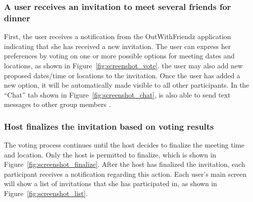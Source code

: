 \subsubsection{A user receives an invitation to meet several friends for dinner}
First, the user receives a notification from the OutWithFriendz application
indicating that she has received a new invitation. The user can express her 
preferences by voting on one or more possible options for meeting dates and
locations, as shown in Figure~\ref{fig:screenshot_vote}.  
the user may also add
new proposed dates/time or locations to the invitation. Once the user has added a new
option, it will be automatically made visible to all other participants. 
In the ``Chat'' tab shown in Figure~\ref{fig:screenshot_chat}, 
is also able to send text messages to other group members .

\subsubsection{Host finalizes the invitation based on voting results}
The voting process continues until the host decides to finalize the meeting time 
and location. Only the host is permitted to finalize, which is shown in
Figure~\ref{fig:screenshot_finalize}. After the host has finalized the
invitation, each participant receives a notification regarding this action. 
Each user's main screen will show a list of invitations that she has 
participated in, as shown in Figure~\ref{fig:screenshot_list}.





